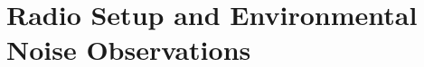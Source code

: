 \documentclass[letterpaper,12pt]{article}
\begin{document}

\section{Radio Setup and Environmental Noise Observations}
\end{document}
